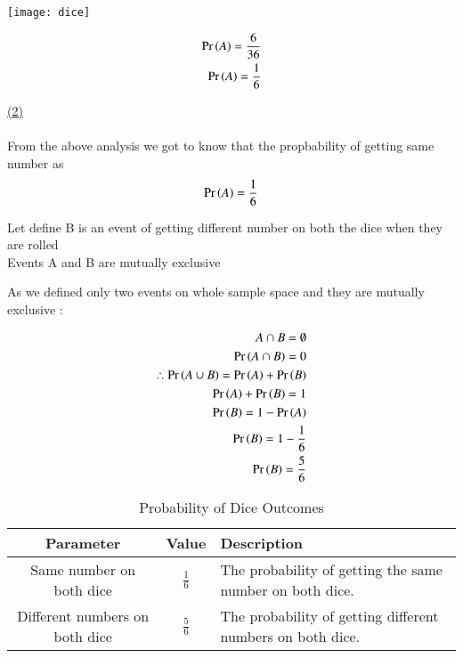 \documentclass[journal,12pt,twocolumn]{IEEEtran}
\begin{document}
    \begin{center}
    \texttt{[image: dice]}
    \end{center}

    \begin{align*}
        \Pr\left(A\right)=\frac{6}{36}\\
        \Pr\left(A\right)=\frac{1}{6}
   \end{align*}


   \underline {(2)} \\ \\

   \noindent From the above analysis we got to know that the propbability of getting same number as 
   \begin{align*}
    \Pr\left(A\right)=\frac{1}{6}
\end{align*}

\noindent Let define {B} i\noindent s an event of getting different number on both the dice when they are rolled\\
Events {A} and {B} are mutually exclusive 

\noindent As we defined only two events on whole sample space and they are mutually exclusive  $ \colon $ 

\begin{align*}
 {A \cap B = \emptyset} \\
 \Pr\left(A \cap B\right)={0}\\
 \therefore \Pr\left(A \cup B\right)=\Pr\left(A\right)+\Pr\left(B\right)\\
 \Pr\left(A\right) + \Pr\left(B\right) = {1} \\
 \Pr\left(B\right) = {1}-\Pr\left(A\right) \\
 \Pr\left(B\right)={1}-\frac{1}{6}\\
 \Pr\left(B\right)=\frac{5}{6}
\end{align*}



\begin{table}[!htbp]
     \renewcommand{\arraystretch}{1.3}
     \caption*{Probability of Dice Outcomes}
     \centering
     \begin{tabular}{|c|c|p{4.2cm}|}
     \hline
     \textbf{Parameter} & \textbf{Value} & \textbf{Description} \\
     \hline
     Same number on both dice & $\frac{1}{6}$ & The probability of getting the same number on both dice. \\
     \hline
     Different numbers on both dice & $\frac{5}{6}$ & The probability of getting different numbers on both dice. \\
     \hline
     \end{tabular}
     \end{table}
     
\end{document}
